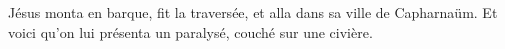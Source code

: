 \encetemps Jésus monta en barque,
	fit la traversée, et alla dans sa ville de Capharnaüm.
Et voici qu’on lui présenta un paralysé, couché sur une civière.
